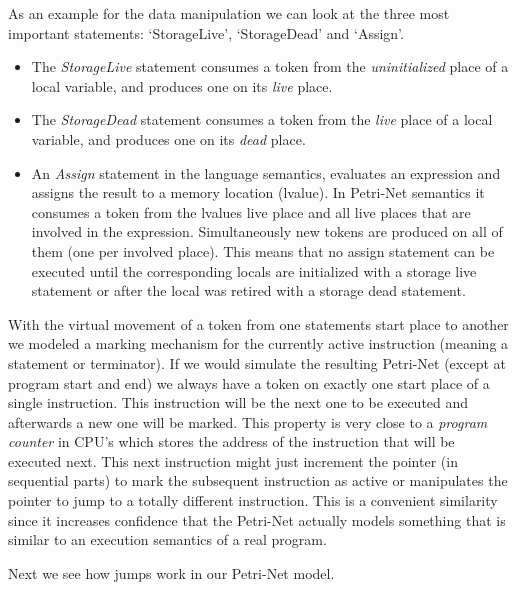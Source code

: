 As an example for the data manipulation we can look at the three most important statements: `StorageLive', `StorageDead' and `Assign'.
\begin{itemize}
    \item The \textit{StorageLive} statement consumes a token from the \textit{uninitialized} place of a local variable, and produces one on its \textit{live} place.
    \item The \textit{StorageDead} statement consumes a token from the \textit{live} place of a local variable, and produces one on its \textit{dead} place.
    \item An \textit{Assign} statement in the language semantics, evaluates an expression and assigns the result to a memory location (lvalue).
    In Petri-Net semantics it consumes a token from the lvalues live place and all live places that are involved in the expression.
    Simultaneously new tokens are produced on all of them (one per involved place).
    This means that no assign statement can be executed until the corresponding locals are initialized with a storage live statement or after the local was retired with a storage dead statement.
\end{itemize}

With the virtual movement of a token from one statements start place to another we modeled a marking mechanism for the currently active instruction (meaning a statement or terminator).
If we would simulate the resulting Petri-Net (except at program start and end) we always have a token on exactly one start place of a single instruction.
This instruction will be the next one to be executed and afterwards a new one will be marked.
This property is very close to a \textit{program counter} in CPU's which stores the address of the instruction that will be executed next.
This next instruction might just increment the pointer (in sequential parts) to mark the subsequent instruction as active or manipulates the pointer to jump to a totally different instruction.
This is a convenient similarity since it increases confidence that the Petri-Net actually models something that is similar to an execution semantics of a real program.

Next we see how jumps work in our Petri-Net model.

